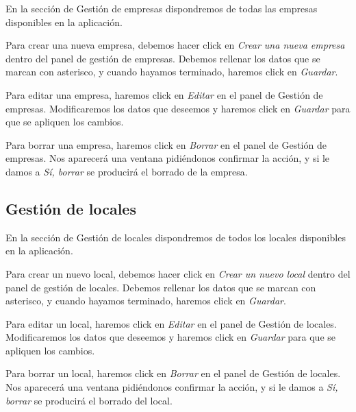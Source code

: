 En la sección de Gestión de empresas dispondremos de todas las empresas disponibles en la aplicación.


Para crear una nueva empresa, debemos hacer click en \textit{Crear una nueva empresa} dentro del panel de gestión de empresas. Debemos rellenar los datos que se marcan con asterisco, y cuando hayamos terminado, haremos click en \textit{Guardar}.


Para editar una empresa, haremos click en \textit{Editar} en el panel de Gestión de empresas. Modificaremos los datos que deseemos y haremos click en \textit{Guardar} para que se apliquen los cambios.


Para borrar una empresa, haremos click en \textit{Borrar} en el panel de Gestión de empresas. Nos aparecerá una ventana pidiéndonos confirmar la acción, y si le damos a \textit{Sí, borrar} se producirá el borrado de la empresa.


\subsection{Gestión de locales}

En la sección de Gestión de locales dispondremos de todos los locales disponibles en la aplicación.


Para crear un nuevo local, debemos hacer click en \textit{Crear un nuevo local} dentro del panel de gestión de locales. Debemos rellenar los datos que se marcan con asterisco, y cuando hayamos terminado, haremos click en \textit{Guardar}.


Para editar un local, haremos click en \textit{Editar} en el panel de Gestión de locales. Modificaremos los datos que deseemos y haremos click en \textit{Guardar} para que se apliquen los cambios.


Para borrar un local, haremos click en \textit{Borrar} en el panel de Gestión de locales. Nos aparecerá una ventana pidiéndonos confirmar la acción, y si le damos a \textit{Sí, borrar} se producirá el borrado del local.

